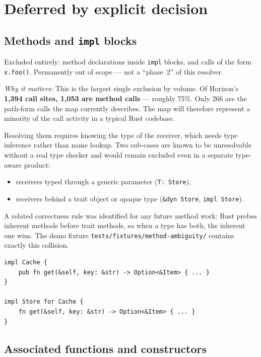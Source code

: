 \documentclass[11pt,a4paper]{article}
\newcommand{\note}{\par\smallskip\noindent\textit{Why it matters:} }
\begin{document}
\section{Deferred by explicit decision}

\subsection{Methods and \texttt{impl} blocks}

Excluded entirely: method declarations inside \verb|impl| blocks, and calls of
the form \verb|x.foo()|. Permanently out of scope --- not a ``phase~2'' of this
resolver.

\note{This is the largest single exclusion by volume. Of Horizon's \textbf{1{,}394
call sites, 1{,}053 are method calls} --- roughly 75\%. Only 266 are the
path-form calls the map currently describes. The map will therefore represent a
minority of the call activity in a typical Rust codebase.}

Resolving them requires knowing the type of the receiver, which needs type
inference rather than name lookup. Two sub-cases are known to be unresolvable
without a real type checker and would remain excluded even in a separate
type-aware product:

\begin{itemize}[nosep]
  \item receivers typed through a generic parameter (\verb|T: Store|),
  \item receivers behind a trait object or opaque type (\verb|&dyn Store|,
    \verb|impl Store|).
\end{itemize}

A related correctness rule was identified for any future method work: Rust probes
inherent methods before trait methods, so when a type has both, the inherent one
wins. The demo fixture \verb|tests/fixtures/method-ambiguity/| contains exactly
this collision.

\begin{lstlisting}
impl Cache {
    pub fn get(&self, key: &str) -> Option<&Item> { ... }
}

impl Store for Cache {
    fn get(&self, key: &str) -> Option<&Item> { ... }
}
\end{lstlisting}

\subsection{Associated functions and constructors}
\end{document}
